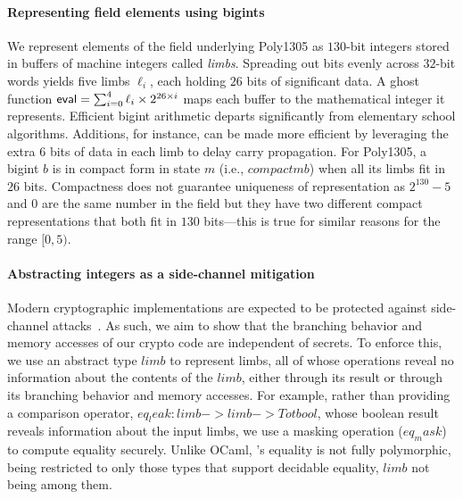 \paragraph*{Representing field elements using bigints}
%
We represent elements of the field underlying Poly1305 as $130$-bit
integers stored in \lowstar buffers of machine integers called
\emph{limbs}.
%
Spreading out bits evenly across $32$-bit words yields five limbs
$\ell_i$, each holding $26$ bits of significant data.
%
A ghost function $\text{\textsf{eval}} = \sum_{i=0}^4 \ell_i\times2^{26\times i}$ maps
%
each buffer to the mathematical integer it represents.
%
Efficient bigint arithmetic departs significantly from elementary
school algorithms. Additions, for instance, can be made more efficient
by leveraging the extra $6$ bits of data in each limb to delay carry
propagation.
%
For Poly1305, a bigint \lst$b$ is in compact form in state \lst$m$
(i.e., \lst$compact m b$) when all its limbs fit in $26$ bits.
%
Compactness does not guarantee uniqueness of representation as
$2^{130}-5$ and $0$ are the same number in the field but they have two
different compact representations that both fit in $130$ bits---this
is true for similar reasons for the range $[0,5)$.

\paragraph*{Abstracting integers as a side-channel mitigation}
%
Modern cryptographic implementations are expected to be protected
against side-channel %
attacks~\cite{Kocher1996}.
As such, we aim to show that the branching behavior and memory
accesses of our crypto code are independent of secrets. To
enforce this, we use an abstract type \lst$limb$ to represent limbs,
all of whose operations reveal no information about the contents of
the \lst$limb$, either through its result or through its branching behavior and
memory accesses. For example, rather than providing a
comparison operator, \lst$eq_leak: limb -> limb -> Tot bool$, whose
boolean result reveals information about the input limbs, we use a
masking operation (\lst$eq_mask$) to compute equality securely. Unlike OCaml, \fstar's
equality is not fully polymorphic, being restricted to only those types
that support decidable equality, \lst$limb$ not being among them. 

